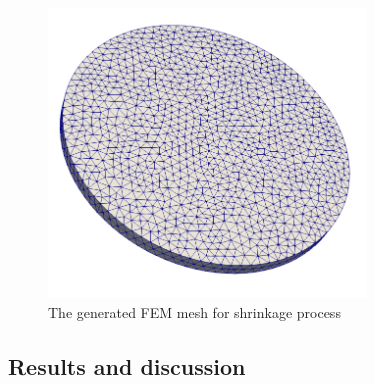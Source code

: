 \begin{figure}[!ht]
\centering
\includegraphics[width=0.75\textwidth]{figures/ME5_VPF_mesh.png}
\caption{The generated FEM mesh for shrinkage process}
\label{fig:ME5_VPF_setup}
\end{figure} 
\subsection{Results and discussion}